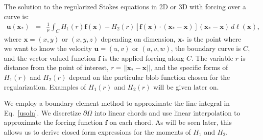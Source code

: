 \documentclass[12pt]{article}
\newcommand{\bx}{\mathbf{x}}
\newcommand{\bu}{\mathbf{u}}
\newcommand{\ff}{\mathbf{f}}
\begin{document}
	The solution to the regularized Stokes equations in 2D or 3D with forcing over a curve is:
	\begin{eqnarray}\label{usoln}
		\bu(\bx_*) &=& \frac{1}{\mu} \int_{C} H_1(r)\ff(\bx) + H_2(r)[\ff(\bx) \cdot (\bx_* - \bx)](\bx_* - \bx) \,d\ell(\bx),
	\end{eqnarray}
	where $\bx = (x,y)$ or $ (x,y,z)$ depending on dimension, $\bx_*$ is the point where we want to know the velocity $\bu = (u,v)$ or $(u,v,w)$, the boundary curve is $C$, and the vector-valued function $\ff$ is the applied forcing along $C$.  The variable $r$ is distance from the point of interest, $r= || \bx_* - \bx ||$, and the specific forms of $H_1(r)$ and $H_2(r)$ depend on the particular blob function chosen for the regularization. Examples of $H_1(r)$ and $H_2(r)$ will be given later on. 
	
	We employ a boundary element method to approximate the line integral in Eq.~\eqref{usoln}. We discretize $\partial \Omega$ into linear chords and use linear interpolation to approximate the forcing function $\ff$ on each chord. As will be seen later, this allows us to derive closed form expressions for the moments of $H_1$ and $H_2$. 
	
\end{document}
